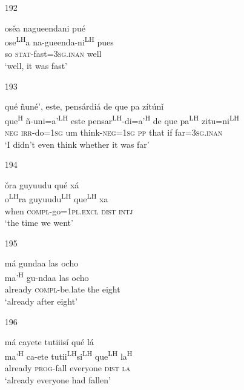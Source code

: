 \begin{itemize}
\item[192]
 
\glll   os\v{e}a nagueendani pu\'{e} \\
ose\textsuperscript{LH}a na-gueenda-ni\textsuperscript{LH} pues\\
so \textsc{stat}-fast=\textsc{3sg.inan} well\\
\glt `well, it was fast'
 


\item[193]
 
\glll   qu\'{e} \~{n}un\'{e}', este, pens\'{a}rdi\'{a} de que pa z\'{i}t\'{u}n\v{i}\\
que\textsuperscript{H} \~{n}-uni=a'\textsuperscript{LH} este pensar\textsuperscript{LH}-di=a'\textsuperscript{H} de que pa\textsuperscript{LH} zitu=ni\textsuperscript{LH}\\
\textsc{neg} \textsc{irr}-do=\textsc{1sg} um think-\textsc{neg}=\textsc{1sg} \textsc{pp} that if far=\textsc{3sg.inan}\\
\glt `I didn't even think whether it was far'
 


\item[194]
 
\glll   \v{o}ra guyuudu qu\'{e} x\'{a} \\
   o\textsuperscript{LH}ra guyuudu\textsuperscript{LH} que\textsuperscript{LH} xa\\
when \textsc{compl}-go=\textsc{1pl.excl} \textsc{dist} \textsc{intj}\\
\glt `the time we went'
 


\item[195]
 
\glll   m\'{a} gundaa las ocho \\
  ma'\textsuperscript{H} gu-ndaa las ocho\\
already \textsc{compl}-be.late the eight\\
\glt `already after eight'
 


\item[196]
 
\glll   m\'{a} cayete tutiiis\'{i} qu\'{e} l\'{a} \\
ma'\textsuperscript{H} ca-ete tutii\textsuperscript{LH}si\textsuperscript{LH} que\textsuperscript{LH} la\textsuperscript{H}\\
already \textsc{prog}-fall everyone \textsc{dist} \textsc{la}\\
\glt `already everyone had fallen'
 



\end{itemize}
